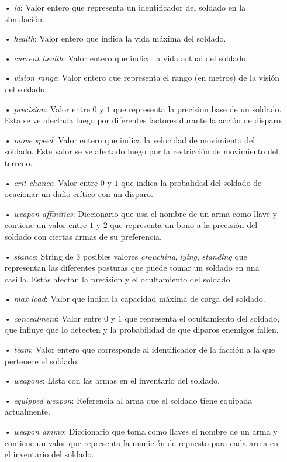 \documentclass{llncs}
\begin{document}
\begin{itemize}
\item[•] \emph{id}: Valor entero que representa un identificador del soldado en la simulaci\'on.
\item[•] \emph{health}: Valor entero que indica la vida m\'axima del soldado.
\item[•] \emph{current health}: Valor entero que indica la vida actual del soldado.
\item[•] \emph{vision range}: Valor entero que representa el rango (en metros) de la visi\'on del soldado.
\item[•] \emph{precision}: Valor entre $0$ y $1$ que representa la precision base de un soldado. Esta se ve afectada luego por diferentes factores durante la acci\'on de disparo.
\item[•] \emph{move speed}: Valor entero que indica la velocidad de movimiento del soldado. Este valor se ve afectado luego por la restricci\'on de movimiento del terreno.
\item[•] \emph{crit chance}: Valor entre $0$ y $1$ que indica la probalidad del soldado de ocacionar un da\~no cr\'itico con un disparo.
\item[•] \emph{weapon affinities}: Diccionario que usa el nombre de un arma como llave y contiene un valor entre $1$ y $2$ que representa un bono a la precisi\'on del soldado con ciertas armas de su preferencia.
\item[•] \emph{stance}: String de $3$ posibles valores \emph{crouching}, \emph{lying}, \emph{standing} que representan las diferentes posturas que puede tomar un soldado en una casilla. Est\'as afectan la precision y el ocultamiento del soldado.
\item[•] \emph{max load}: Valor que indica la capacidad m\'axima de carga del soldado.
\item[•] \emph{concealment}: Valor entre $0$ y $1$ que representa el ocultamiento del soldado, que influye que lo detecten y la probabilidad de que diparos enemigos fallen.
\item[•] \emph{team}: Valor entero que corresponde al identificador de la facci\'on a la que pertenece el soldado.
\item[•] \emph{weapons}: Lista con las armas en el inventario del soldado.
\item[•]\emph{equipped weapon}: Referencia al arma que el soldado tiene equipada actualmente.
\item[•] \emph{weapon ammo}: Diccionario que toma como llaves el nombre de un arma y contiene un valor que representa la munici\'on de repuesto para cada arma en el inventario del soldado.
\end{itemize}
\end{document}
